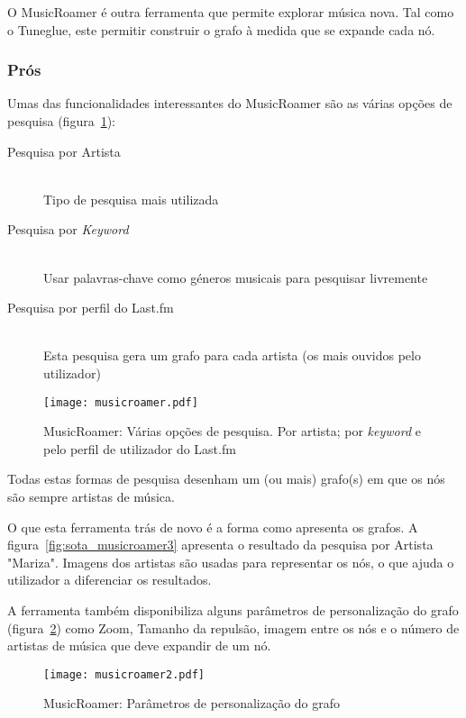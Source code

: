   O MusicRoamer é outra ferramenta que permite explorar música nova.
  Tal como o Tuneglue, este permitir construir o grafo à medida que se expande cada nó.



  \subsubsection{Prós} %
  \label{ssub:pros}

  
  Umas das funcionalidades interessantes do MusicRoamer são as várias opções de pesquisa (figura~\ref{fig:sota_musicroamer}):
  \begin{description}
    \item[Pesquisa por Artista] \hfill \\
      Tipo de pesquisa mais utilizada
    \item[Pesquisa por \emph{Keyword}] \hfill \\
      Usar palavras-chave como géneros musicais para pesquisar livremente
    \item[Pesquisa por perfil do Last.fm] \hfill \\
      Esta pesquisa gera um grafo para cada artista (os mais ouvidos pelo utilizador)
  \end{description}

  \begin{figure}[tb]
    \begin{center}
      \texttt{[image: musicroamer.pdf]}
    \end{center}
    \caption{MusicRoamer: Várias opções de pesquisa. Por artista; por \emph{keyword} e pelo perfil de utilizador do Last.fm}
    \label{fig:sota_musicroamer}
  \end{figure}

  Todas estas formas de pesquisa desenham um (ou mais) grafo(s) em que os nós são sempre artistas de música.

  O que esta ferramenta trás de novo é a forma como apresenta os grafos.
  A figura~\ref{fig:sota_musicroamer3} apresenta o resultado da pesquisa por Artista "Mariza".
  Imagens dos artistas são usadas para representar os nós, o que ajuda o utilizador a diferenciar os resultados.

  A ferramenta também disponibiliza alguns parâmetros de personalização do grafo (figura~\ref{fig:sota_musicroamer2}) como Zoom, Tamanho da repulsão, imagem entre os nós e o número de artistas de música que deve expandir de um nó.

  \begin{figure}[tb]
    \begin{center}
      \texttt{[image: musicroamer2.pdf]}
    \end{center}
    \caption{MusicRoamer: Parâmetros de personalização do grafo}
    \label{fig:sota_musicroamer2}
  \end{figure}



